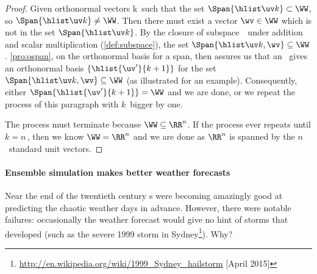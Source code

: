 \begin{proof}
Given orthonormal vectors \hlist\uv k\ such that the set \(\Span\{\hlist\uv k\}\subset\WW\), so \(\Span\{\hlist\uv k\}\neq\WW\).  
Then there must exist a vector \(\wv\in\WW\) which is not in the set \(\Span\{\hlist\uv k\}\).
By the closure of subspace~\WW\ under addition and scalar multiplication (\cref{def:subspace}), the set \(\Span\{\hlist\uv k,\wv\}\subseteq\WW\).
\cref{pro:ospan}, on the orthonormal basis for a span, then assures us that an \svd\ gives an orthonormal basis \(\{\hlist{\uv'}{k+1}\}\) for the set \(\Span\{\hlist\uv k,\wv\}\subseteq\WW\) (as illustrated for an example).
Consequently, either \(\Span\{\hlist{\uv'}{k+1}\}=\WW\) and we are done, or we repeat the process of this paragraph with \(k\)~bigger by one.
\begin{center}
\end{center}

The process must terminate because \(\WW\subseteq\RR^n\). 
If the process ever repeats until \(k=n\)\,, then we know \(\WW=\RR^n\) and we are done as \(\RR^n\) is spanned by the \(n\)~standard unit vectors.
\end{proof}





\paragraph{Ensemble simulation makes better weather forecasts}
Near the end of the twentieth century s were becoming amazingly good at predicting the chaotic weather days in advance.
However, there were notable failures: occasionally the weather forecast would give no hint of storms that developed (such as the severe 1999 storm in Sydney\footnote{\url{http://en.wikipedia.org/wiki/1999_Sydney_hailstorm} [April 2015]}).
Why?

